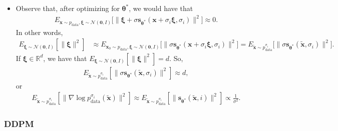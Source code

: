 \documentclass[10pt]{article}
\newcommand{\ve}[1]{\mathbf{#1}}
\newcommand{\mrm}[1]{\mathrm{#1}}
\newcommand{\ves}[1]{\boldsymbol{#1}}
\newcommand{\mcal}[1]{\mathcal{#1}}
\newcommand{\Real}{\mathbb{R}}
\begin{document}
\begin{itemize}
  \item Observe that, after optimizing for $\ves{\theta}^*$, we would have that
  \begin{align*}
    E_{\ve{x} \sim p_{\mrm{data}}, \ves{\xi} \sim \mathcal{N}(\ve{0}, I)} \big[ \big\| \ves{\xi} + \sigma \ve{s}_{\ves{\theta}^*}(\ve{x} + \sigma_i \ves{\xi}, \sigma_i) \big\|^2 \big] \approx 0.
  \end{align*}
  In other words,
  \begin{align*}
    E_{\ves{\xi} \sim \mcal{N}(\ve{0},I)} [\| \ves{\xi} \|^2 ]
    &\approx
    E_{\ve{x}_0 \sim p_{\mrm{data}}, \ves{\xi} \sim \mcal{N}(\ve{0},I)} \big[ \big\| \sigma \ve{s}_{\ves{\theta}^*}(\ve{x} + \sigma_i \ves{\xi}, \sigma_i) \big\|^2 \big] 
    = E_{\widetilde{\ve{x}} \sim p_{\mrm{data}}^{\sigma_i}} \big[ \big\| \sigma \ve{s}_{\ves{\theta}^*}(\widetilde{\ve{x}}, \sigma_i) \big\|^2 \big].
  \end{align*}
  If $\ves{\xi} \in \Real^d$, we have that $E_{\ves{\xi} \sim \mcal{N}(\ve{0},I)} [\| \ves{\xi} \|^2 ] = d$. So,
  \begin{align*}
    E_{\widetilde{\ve{x}} \sim p_{\mrm{data}}^{\sigma_i}} [\| \sigma \ve{s}_{\ves{\theta}^*} (\widetilde{\ve{x}}, \sigma_i) \|^2 ] \approx d,
  \end{align*}
  or 
  \begin{align*}
    E_{\widetilde{\ve{x}} \sim p_{\mrm{data}}^{\sigma_i}} [\| \nabla \log p_{\mrm{data}}^{\sigma_i}(\widetilde{\ve{x}}) \|^2 ] 
    \approx E_{\widetilde{\ve{x}} \sim p_{\mrm{data}}^{\sigma_i}} [\| \ve{s}_{\ves{\theta}^*}(\widetilde{\ve{x}}, i) \|^2 ] \propto \frac{1}{\sigma^2}.
  \end{align*}
\end{itemize}

\subsubsection{DDPM}
\end{document}
